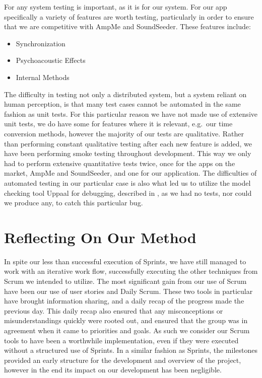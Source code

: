 \bigskip
For any system testing is important, as it is for our system.
For our app specifically a variety of features are worth testing, particularly in order to ensure that we are competitive with AmpMe and SoundSeeder.
These features include:
\begin{multicols}{3}
\begin{itemize}
    \item Synchronization
    \item Psychoacoustic Effects
    \item Internal Methods
\end{itemize}
\end{multicols}

The difficulty in testing not only a distributed system, but a system reliant on human perception, is that many test cases cannot be automated in the same fashion as unit tests.
For this particular reason we have not made use of extensive unit tests, we do have some for features where it is relevant, e.g.\ our time conversion methods, however the majority of our tests are qualitative.
Rather than performing constant qualitative testing after each new feature is added, we have been performing smoke testing throughout development.
This way we only had to perform extensive quantitative tests twice, once for the apps on the market, AmpMe and SoundSeeder, and one for our application.
The difficulties of automated testing in our particular case is also what led us to utilize the model checking tool Uppaal for debugging, described in , as we had no tests, nor could we produce any, to catch this particular bug.

\section{Reflecting On Our Method}
In spite our less than successful execution of Sprints, we have still managed to work with an iterative work flow, successfully executing the other techniques from Scrum we intended to utilize.
The most significant gain from our use of Scrum have been our use of user stories and Daily Scrum.
These two tools in particular have brought information sharing, and a daily recap of the progress made the previous day.
This daily recap also ensured that any misconceptions or misunderstandings quickly were rooted out, and ensured that the group was in agreement when it came to priorities and goals.
As such we consider our Scrum tools to have been a worthwhile implementation, even if they were executed without a structured use of Sprints.
In a similar fashion as Sprints, the milestones provided an early structure for the development and overview of the project, however in the end its impact on our development has been negligible.

